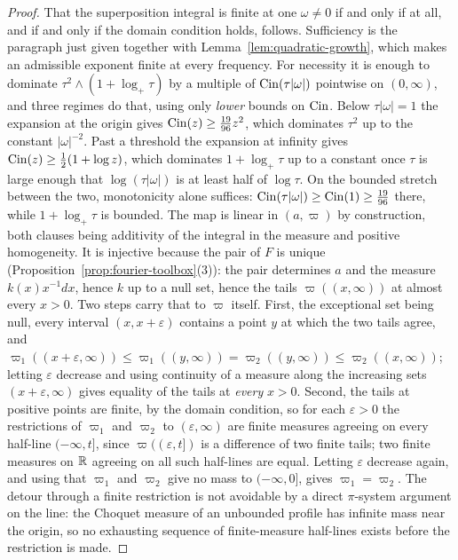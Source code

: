 \begin{proof}
That the superposition integral is finite at one $\omega \ne 0$ if and only if at all, and if
and only if the domain condition holds, follows. Sufficiency is the paragraph just given
together with Lemma~\ref{lem:quadratic-growth}, which makes an admissible exponent finite at
every frequency. For necessity it is enough to dominate $\tau^2 \wedge (1 + \log_+\tau)$ by a
multiple of $\operatorname{Cin}(\tau|\omega|)$ pointwise on $(0,\infty)$, and three regimes do that, using
only \emph{lower} bounds on $\operatorname{Cin}$. Below $\tau|\omega| = 1$ the expansion at the origin gives
$\operatorname{Cin}(z) \ge \tfrac{19}{96}z^2$, which dominates $\tau^2$ up to the constant
$|\omega|^{-2}$. Past a threshold the expansion at infinity gives
$\operatorname{Cin}(z) \ge \tfrac12(1 + \log z)$, which dominates $1 + \log_+\tau$ up to a constant once
$\tau$ is large enough that $\log(\tau|\omega|)$ is at least half of $\log\tau$. On the bounded
stretch between the two, monotonicity alone suffices:
$\operatorname{Cin}(\tau|\omega|) \ge \operatorname{Cin}(1) \ge \tfrac{19}{96}$ there, while $1 + \log_+\tau$ is bounded.
The map is linear in $(a,\varpi)$ by construction, both clauses being additivity of the
integral in the measure and positive homogeneity. It is injective because the pair of $F$ is
unique (Proposition~\ref{prop:fourier-toolbox}(3)): the pair determines $a$ and the \Levy{}
measure $k(x)x^{-1}dx$, hence $k$ up to a null set, hence the tails $\varpi((x,\infty))$ at
almost every $x > 0$. Two steps carry that to $\varpi$ itself. First, the exceptional set being
null, every interval $(x, x + \varepsilon)$ contains a point $y$ at which the two tails agree,
and $\varpi_1((x + \varepsilon,\infty)) \le \varpi_1((y,\infty)) = \varpi_2((y,\infty)) \le
\varpi_2((x,\infty))$; letting $\varepsilon$ decrease and using continuity of a measure along
the increasing sets $(x + \varepsilon, \infty)$ gives equality of the tails at \emph{every}
$x > 0$. Second, the tails at positive points are finite, by the domain condition, so for each
$\varepsilon > 0$ the restrictions of $\varpi_1$ and $\varpi_2$ to $(\varepsilon,\infty)$ are
finite measures agreeing on every half-line $(-\infty,t]$, since $\varpi((\varepsilon,t])$ is a
difference of two finite tails; two finite measures on $\mathbb{R}$ agreeing on all such half-lines are
equal. Letting $\varepsilon$ decrease again, and using that $\varpi_1$ and $\varpi_2$ give no
mass to $(-\infty,0]$, gives $\varpi_1 = \varpi_2$. The detour through a finite restriction is
not avoidable by a direct $\pi$-system argument on the line: the Choquet measure of an unbounded
profile has infinite mass near the origin, so no exhausting sequence of finite-measure
half-lines exists before the restriction is made.


\end{proof}
